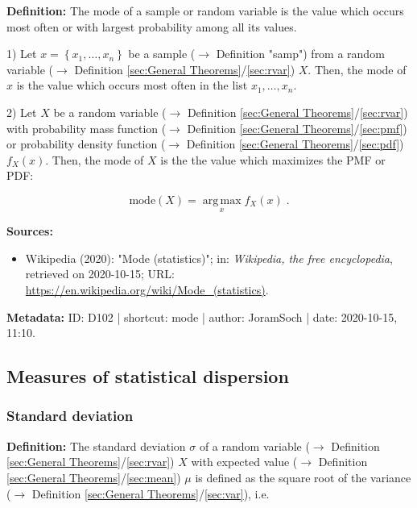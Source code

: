 \documentclass[a4paper,12pt,twoside]{book}
\begin{document}
\textbf{Definition:} The mode of a sample or random variable is the value which occurs most often or with largest probability among all its values.

\vspace{1em}
1) Let $x = \left\lbrace x_1, \ldots, x_n \right\rbrace$ be a sample ($\rightarrow$ Definition "samp") from a random variable ($\rightarrow$ Definition \ref{sec:General Theorems}/\ref{sec:rvar}) $X$. Then, the mode of $x$ is the value which occurs most often in the list $x_1, \ldots, x_n$.

\vspace{1em}
2) Let $X$ be a random variable ($\rightarrow$ Definition \ref{sec:General Theorems}/\ref{sec:rvar}) with probability mass function ($\rightarrow$ Definition \ref{sec:General Theorems}/\ref{sec:pmf}) or probability density function ($\rightarrow$ Definition \ref{sec:General Theorems}/\ref{sec:pdf}) $f_X(x)$. Then, the mode of $X$ is the the value which maximizes the PMF or PDF:

\begin{equation} \label{eq:mode-mode-rvar}
\mathrm{mode}(X) = \operatorname*{arg\,max}_x f_X(x) \; .
\end{equation}


\vspace{1em}
\textbf{Sources:}
\begin{itemize}
\item Wikipedia (2020): "Mode (statistics)"; in: \textit{Wikipedia, the free encyclopedia}, retrieved on 2020-10-15; URL: \url{https://en.wikipedia.org/wiki/Mode_(statistics)}.
\end{itemize}


\vspace{1em}
\textbf{Metadata:} ID: D102 | shortcut: mode | author: JoramSoch | date: 2020-10-15, 11:10.
\vspace{1em}



\subsection{Measures of statistical dispersion}

\subsubsection[\textit{Standard deviation}]{Standard deviation} \label{sec:std}
\setcounter{equation}{0}

\textbf{Definition:} The standard deviation $\sigma$ of a random variable ($\rightarrow$ Definition \ref{sec:General Theorems}/\ref{sec:rvar}) $X$ with expected value ($\rightarrow$ Definition \ref{sec:General Theorems}/\ref{sec:mean}) $\mu$ is defined as the square root of the variance ($\rightarrow$ Definition \ref{sec:General Theorems}/\ref{sec:var}), i.e.
\end{document}

